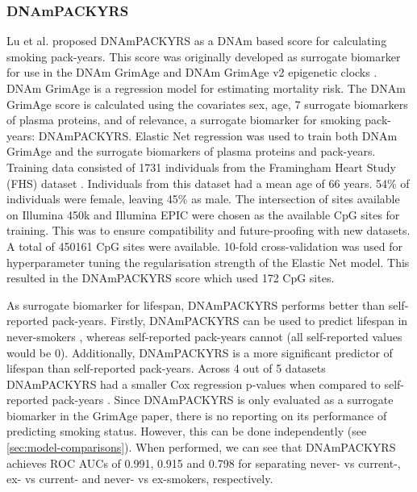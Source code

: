 \documentclass{article} %
\begin{document}
\subsubsection{DNAmPACKYRS} \label{sec:dnampackyrs}
Lu et al. \cite{lu2019dna} proposed DNAmPACKYRS as a DNAm based score for calculating smoking pack-years. This score was originally developed as surrogate biomarker for use in the DNAm GrimAge \cite{lu2019dna} and DNAm GrimAge v2 epigenetic clocks \cite{lu2022dna}. DNAm GrimAge is a regression model for estimating mortality risk. The DNAm GrimAge score is calculated using the covariates sex, age, 7 surrogate biomarkers of plasma proteins, and of relevance, a surrogate biomarker for smoking pack-years: DNAmPACKYRS. Elastic Net regression was used to train both DNAm GrimAge and the surrogate biomarkers of plasma proteins and pack-years. Training data consisted of 1731 individuals from the Framingham Heart Study (FHS) dataset \cite{doi:10.2105/AJPH.41.3.279}. Individuals from this dataset had a mean age of 66 years. 54\% of individuals were female, leaving 45\% as male. The intersection of sites available on Illumina 450k and Illumina EPIC were chosen as the available CpG sites for training. This was to ensure compatibility and future-proofing with new datasets. A total of \num{450161} CpG sites were available. 10-fold cross-validation was used for hyperparameter tuning the regularisation strength of the Elastic Net model. This resulted in the DNAmPACKYRS score which used 172 CpG sites.

As surrogate biomarker for lifespan, DNAmPACKYRS performs better than self-reported pack-years. Firstly, DNAmPACKYRS can be used to predict lifespan in never-smokers \cite{lu2019dna}, whereas self-reported pack-years cannot (all self-reported values would be 0). Additionally, DNAmPACKYRS is a more significant predictor of lifespan than self-reported pack-years. Across 4 out of 5 datasets DNAmPACKYRS had a smaller Cox regression p-values when compared to self-reported pack-years \cite{lu2019dna}. Since DNAmPACKYRS is only evaluated as a surrogate biomarker in the GrimAge paper, there is no reporting on its performance of predicting smoking status. However, this can be done independently (see \ref{sec:model-comparisons}). When performed, we can see that DNAmPACKYRS achieves ROC AUCs of 0.991, 0.915 and 0.798 for separating never- vs current-, ex- vs current- and never- vs ex-smokers, respectively.
\end{document}
